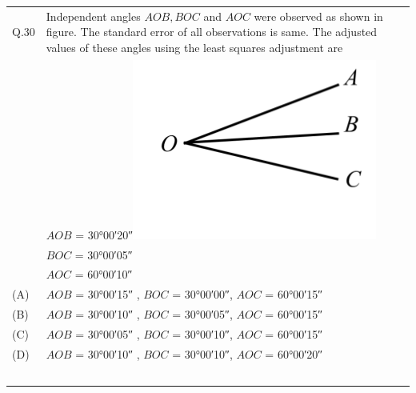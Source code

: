 \documentclass[12pt]{article}
\begin{document}
\begin{table}[H]
\renewcommand{\arraystretch}{2.5}
\setlength{\tabcolsep}{8pt}
\begin{tabular}{|l|p{15cm}|}
\hline

& \\ \hline
 Q.30 &Independent angles $AOB, BOC$ and $AOC$ were observed as shown in figure. The
standard error of all observations is same. The adjusted values of these angles
using the least squares adjustment are\\ \hline
& $AOB$ = \ang{30;00;20}\includegraphics[scale = 0.9]{LatexImage5.png} \\
& $BOC$ = \ang{30;00;05}\\
& $AOC$ = \ang{60;00;10} \\ \hline
(A)&$AOB$ = \ang{30;00;15} , $BOC$ = \ang{30;00;00}, $AOC$ = \ang{60;00;15}\\ \hline
(B)&$AOB$ = \ang{30;00;10} , $BOC$ = \ang{30;00;05}, $AOC$ = \ang{60;00;15}\\ \hline
(C)&$AOB$ = \ang{30;00;05} , $BOC$ = \ang{30;00;10}, $AOC$ = \ang{60;00;15}\\ \hline
(D)&$AOB$ = \ang{30;00;10} , $BOC$ = \ang{30;00;10}, $AOC$ = \ang{60;00;20} \\ \hline
 & \\
 & \\
 & \\
  & \\
 & \\ \hline


\end{tabular}
\end{table}
\end{document}

